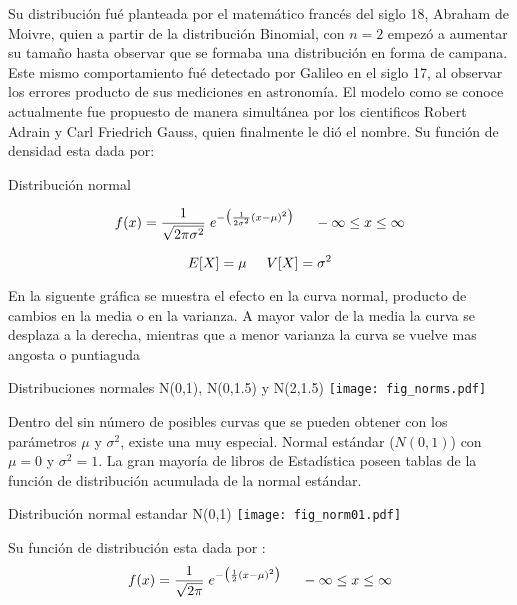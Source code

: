\documentclass[base=hide,12pt]{elegantbook}
\begin{document}
Su distribución fué planteada por el matemático francés del siglo 18, Abraham de Moivre, quien a partir de la distribución Binomial, con $n=2$ empezó a aumentar su tamaño hasta observar que se formaba una distribución en forma de campana. Este mismo comportamiento fué detectado por Galileo en el siglo 17, al observar los errores producto de sus mediciones en astronomía. El modelo como se conoce actualmente fue propuesto de manera simultánea por los cientificos Robert Adrain y Carl Friedrich Gauss, quien finalmente le dió el nombre.
\noindent Su función de densidad esta dada por:

\begin{Box2}{Distribución normal}
	
	$$f(x)= \dfrac{1}{\sqrt{2\pi \sigma^{2}}} \hspace{.1cm} e^{-\big(\frac{1}{2\sigma^{2}}(x-\mu)^{2}\big)}	 \hspace{.5cm}  -\infty \leq  x \leq \infty $$  
	
	$$E[X]=\mu \hspace{.5cm}  V[X]=\sigma^{2}$$
\end{Box2}

En la siguente gráfica se muestra el efecto en la curva normal, producto de cambios en la media o en la varianza. A mayor valor de la media la curva se desplaza a la derecha, mientras que a menor varianza la curva se vuelve mas angosta o puntiaguda 

\begin{center}
	Distribuciones normales \textcolor{col4}{N(0,1)}, \textcolor{col5}{N(0,1.5)} y \textcolor{col3}{N(2,1.5)}
	\texttt{[image: fig\_norms.pdf]} %
\end{center}

Dentro del sin número de posibles curvas que se pueden obtener con los parámetros $\mu$ y $\sigma^{2}$, existe una muy especial. Normal estándar ($N(0,1)$) con $\mu=0$ y $\sigma^{2}=1$.  La gran mayoría de libros de Estadística poseen tablas de la función de distribución acumulada de la normal estándar.\\

\begin{center}
	Distribución normal estandar N(0,1)
	\texttt{[image: fig\_norm01.pdf]} %
\end{center} 

Su función de distribución esta dada por :
$$f(x)= \dfrac{1}{\sqrt{2\pi}} \hspace{.1cm} e^{-\big(\frac{1}{2}(x-\mu)^{2}\big)}	 \hspace{.5cm}  -\infty \leq  x \leq \infty $$ 
\end{document}

